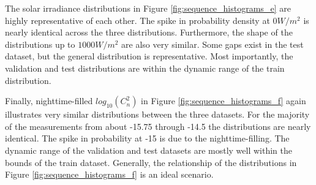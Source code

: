 The solar irradiance distributions in Figure \ref{fig:sequence_histograms_e} are highly representative of each other. The spike in probability density at $0 W/m^{2}$ is nearly identical across the three distributions. Furthermore, the shape of the distributions up to $1000 W/m^{2}$ are also very similar. Some gaps exist in the test dataset, but the general distribution is representative. Most importantly, the validation and test distributions are within the dynamic range of the train distribution.

Finally, nighttime-filled $log_{10}(C_{n}^{2})$ in Figure \ref{fig:sequence_histograms_f} again illustrates very similar distributions between the three datasets. For the majority of the measurements from about -15.75 through -14.5 the distributions are nearly identical. The spike in probability at -15 is due to the nighttime-filling. The dynamic range of the validation and test datasets are mostly well within the bounds of the train dataset. Generally, the relationship of the distributions in Figure \ref{fig:sequence_histograms_f} is an ideal scenario.

